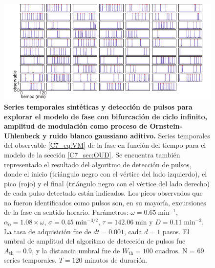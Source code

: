 \documentclass[./main.tex]{subfiles}
\begin{document}
\begin{subappendices}
 
\begin{figure}
    \centering
    \includegraphics[width=1\columnwidth]{figures/chapter7/C7_OUD_traces_for_evaluation_VM.pdf} 
    \caption{\textbf{Series temporales sintéticas y detección de pulsos para explorar el modelo de fase con bifurcación de ciclo infinito, amplitud de modulación como proceso de Ornstein-Uhlenbeck y ruido blanco gaussiano aditivo.} Series temporales del observable \ref{C7_eq:VM} de la fase en función del tiempo para el modelo de la sección \ref{C7_sec:OUD}. Se encuentra también representado el resultado del algoritmo de detección de pulsos, donde el inicio (triángulo negro con el vértice del lado izquierdo), el pico (rojo) y el final (triángulo negro con el vértice del lado derecho) de cada pulso detectado están indicados. Los picos observados que no fueron identificados como pulsos son, en su mayoría, excursiones de la fase en sentido horario. Parámetros: $\omega = 0.65 \;\text{min}^{-1}$, $\alpha_0 = 1.08 \times \omega$, $ \sigma = 0.45 \;\text{min}^{-3/2}$, $\tau = 142.06 \; \text{min} $ y $D = 0.11 \;\text{min}^{-2}$. La tasa de adquisición fue de $dt = 0.001$, cada $d = 1$ pasos. El umbral de amplitud del algoritmo de detección de pulsos fue $A_{\text{th}} = 0.9$, y la distancia umbral fue de $W_{\text{th}} = 100\text{ cuadros}$. N = $69$ series temporales. $T = 120$ minutos de duración.}
    \label{C7_fig:OUD_traces_VM}
\end{figure}


\end{subappendices}
\end{document}

